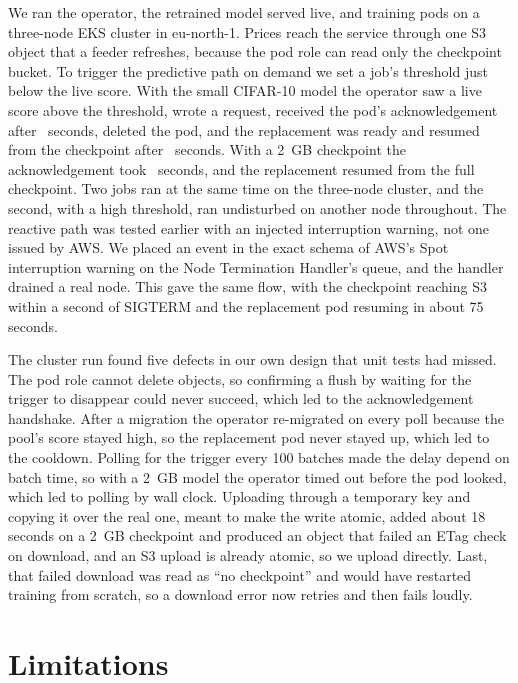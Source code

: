 \documentclass{article}
\begin{document}
We ran the operator, the retrained model served live, and training pods on a three-node EKS cluster in eu-north-1. Prices reach the service through one S3 object that a feeder refreshes, because the pod role can read only the checkpoint bucket. To trigger the predictive path on demand we set a job's threshold just below the live score. With the small CIFAR-10 model the operator saw a live score above the threshold, wrote a request, received the pod's acknowledgement after \drillAckSmall\ seconds, deleted the pod, and the replacement was ready and resumed from the checkpoint after \drillResumeSmall\ seconds. With a 2~GB checkpoint the acknowledgement took \drillAckBig\ seconds, and the replacement resumed from the full checkpoint. Two jobs ran at the same time on the three-node cluster, and the second, with a high threshold, ran undisturbed on another node throughout. The reactive path was tested earlier with an injected interruption warning, not one issued by AWS. We placed an event in the exact schema of AWS's Spot interruption warning on the Node Termination Handler's queue, and the handler drained a real node. This gave the same flow, with the checkpoint reaching S3 within a second of SIGTERM and the replacement pod resuming in about 75 seconds.

The cluster run found five defects in our own design that unit tests had missed. The pod role cannot delete objects, so confirming a flush by waiting for the trigger to disappear could never succeed, which led to the acknowledgement handshake. After a migration the operator re-migrated on every poll because the pool's score stayed high, so the replacement pod never stayed up, which led to the cooldown. Polling for the trigger every 100 batches made the delay depend on batch time, so with a 2~GB model the operator timed out before the pod looked, which led to polling by wall clock. Uploading through a temporary key and copying it over the real one, meant to make the write atomic, added about 18 seconds on a 2~GB checkpoint and produced an object that failed an ETag check on download, and an S3 upload is already atomic, so we upload directly. Last, that failed download was read as ``no checkpoint'' and would have restarted training from scratch, so a download error now retries and then fails loudly.

\section{Limitations}
\label{sec:limits}
\end{document}
